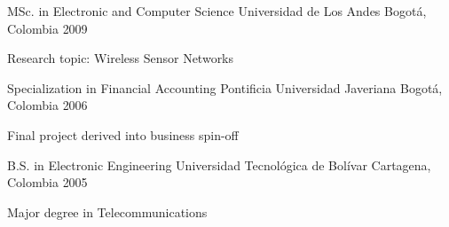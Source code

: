 

\begin{cventries}

  \cventry
    {MSc. in Electronic and Computer Science} %
    {Universidad de Los Andes} %
    {Bogotá, Colombia} %
    {2009} %
    {
      \begin{cvitems} %
        \item {Research topic: Wireless Sensor Networks}
      \end{cvitems}
    }

  \cventry
    {Specialization in Financial Accounting} %
    {Pontificia Universidad Javeriana} %
    {Bogotá, Colombia} %
    {2006} %
    {
      \begin{cvitems} %
        \item {Final project derived into business spin-off}
      \end{cvitems}
    }

  \cventry
    {B.S. in Electronic Engineering} %
    {Universidad Tecnológica de Bolívar} %
    {Cartagena, Colombia} %
    {2005} %
    {
      \begin{cvitems} %
        \item {Major degree in Telecommunications}
      \end{cvitems}
    }

\end{cventries}

